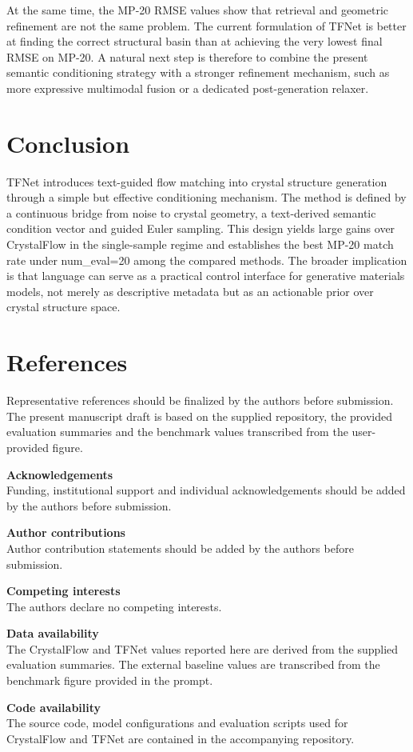 \documentclass[fleqn,10pt]{wlscirep}
\begin{document}
At the same time, the MP-20 RMSE values show that retrieval and geometric refinement are not the same problem. The current formulation of TFNet is better at finding the correct structural basin than at achieving the very lowest final RMSE on MP-20. A natural next step is therefore to combine the present semantic conditioning strategy with a stronger refinement mechanism, such as more expressive multimodal fusion or a dedicated post-generation relaxer.

\section*{Conclusion}
TFNet introduces text-guided flow matching into crystal structure generation through a simple but effective conditioning mechanism. The method is defined by a continuous bridge from noise to crystal geometry, a text-derived semantic condition vector and guided Euler sampling. This design yields large gains over CrystalFlow in the single-sample regime and establishes the best MP-20 match rate under num\_eval=20 among the compared methods. The broader implication is that language can serve as a practical control interface for generative materials models, not merely as descriptive metadata but as an actionable prior over crystal structure space.

\section*{References}
Representative references should be finalized by the authors before submission. The present manuscript draft is based on the supplied repository, the provided evaluation summaries and the benchmark values transcribed from the user-provided figure.

\noindent\textbf{Acknowledgements}\\
Funding, institutional support and individual acknowledgements should be added by the authors before submission.

\noindent\textbf{Author contributions}\\
Author contribution statements should be added by the authors before submission.

\noindent\textbf{Competing interests}\\
The authors declare no competing interests.

\noindent\textbf{Data availability}\\
The CrystalFlow and TFNet values reported here are derived from the supplied evaluation summaries. The external baseline values are transcribed from the benchmark figure provided in the prompt.

\noindent\textbf{Code availability}\\
The source code, model configurations and evaluation scripts used for CrystalFlow and TFNet are contained in the accompanying repository.
\end{document}
